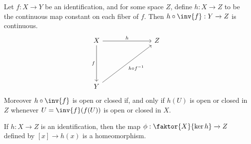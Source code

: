 \begin{corollary}
    Let $f:X \xrightarrow{} Y$ be an identification, and for some space $Z$,
    define  $h:X \xrightarrow{} Z$ to be the continuous map constant on each
    fiber of $f$. Then $h \circ \inv{f}:Y \xrightarrow{} Z$ is continuous.
    \[\begin{tikzcd}
        X &&& Z \\
        \\
        \\
        Y
        \arrow["h", from=1-1, to=1-4]
        \arrow["f"', from=1-1, to=4-1]
        \arrow["{h \circ f^{-1}}"', from=4-1, to=1-4]
    \end{tikzcd}\]
    Moreover $h \circ \inv{f}$ is open or closed if, and only if $h(U)$ is open
    or closed in $Z$ whenever $U=\inv{f}(f(U))$ is open or closed in $X$.
\end{corollary}
\begin{corollary}
    If $h:X \xrightarrow{} Z$ is an identification, then the map
    $\phi:\faktor{X}{\ker{h}} \xrightarrow{} Z$ defined by $[x] \xrightarrow{}
    h(x)$ is a homeomorphism.
\end{corollary}
